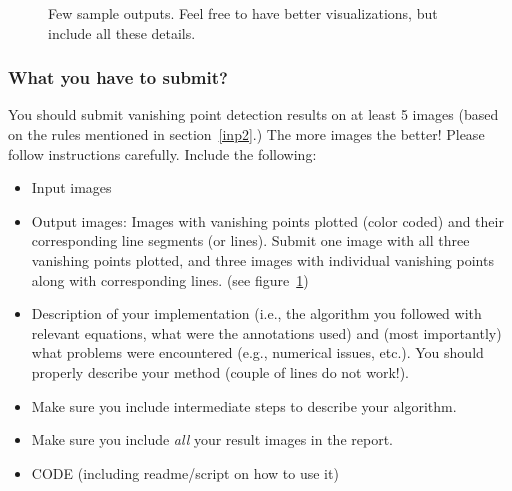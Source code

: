\documentclass[11pt]{article}
\begin{document}
\begin{figure}[!h]
\begin{subfigure}[Left and Right VPs]
{}
\end{subfigure}
\quad
\begin{subfigure}[All VPs]
{
}
\end{subfigure}
\caption{Few sample outputs. Feel free to have better visualizations, but include all these details.}
\vspace{1in}
\label{fig:vps}
\end{figure}

\subsubsection{What you have to submit?}
\label{sec:tosubmit}
You should submit vanishing point detection results on at least 5 images (based on the rules mentioned in section~\ref{inp2}.) The more images the better! Please follow instructions carefully. Include the following:
\begin{itemize}
\item Input images
\item Output images: Images with vanishing points plotted (color coded) and their corresponding line segments (or lines). Submit one image with all three vanishing points plotted, and three images with individual vanishing points along with corresponding lines. (see figure~\ref{fig:vps})
\item Description of your implementation (i.e., the algorithm you followed with relevant equations,
what were the annotations used) and (most importantly) what problems were encountered (e.g., numerical issues, etc.). You should properly describe your method (couple of lines do not work!).
\item Make sure you include intermediate steps to describe your algorithm.
\item Make sure you include {\it all} your result images in the report.
\item CODE (including readme/script on how to use it)
\end{itemize}
\end{document}
